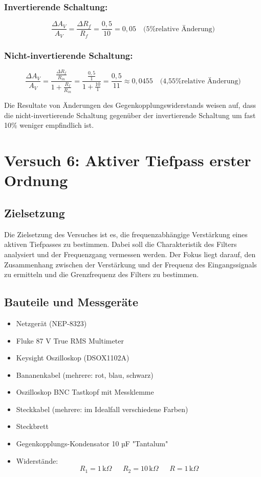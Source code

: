 \documentclass[a4paper,12pt]{article}
\begin{document}
\subsubsection*{Invertierende Schaltung:}
\[
\frac{\Delta A_V}{A_V} = \frac{\Delta R_f}{R_f} = \frac{0,5}{10} = 0,05 \quad \text{(5\% relative Änderung)}
\]

\subsubsection*{Nicht-invertierende Schaltung:}
\[
\frac{\Delta A_V}{A_V} = \frac{\frac{\Delta R_f}{R_{in}}}{1 + \frac{R_f}{R_{in}}} = \frac{\frac{0,5}{1}}{1 + \frac{10}{1}} = \frac{0,5}{11} \approx 0,0455 \quad \text{(4,55\% relative Änderung)}
\]

\noindent Die Resultate von Änderungen des Gegenkopplungswiderstands weisen auf, dass die nicht-invertierende Schaltung gegenüber der invertierende Schaltung um fast 10\% weniger empfindlich ist. 



\newpage
\section{Versuch 6: Aktiver Tiefpass erster Ordnung}
\subsection{Zielsetzung}

Die Zielsetzung des Versuches ist es, die frequenzabhängige Verstärkung eines aktiven Tiefpasses zu bestimmen. Dabei soll die Charakteristik des Filters analysiert und der Frequenzgang vermessen werden. Der Fokus liegt darauf, den Zusammenhang zwischen der Verstärkung und der Frequenz des Eingangssignals zu ermitteln und die Grenzfrequenz des Filters zu bestimmen.
\subsection{Bauteile und Messgeräte}
\begin{itemize}

\item Netzgerät (NEP-8323)
\item Fluke 87 V True RMS Multimeter
\item Keysight Oszilloskop (DSOX1102A)
\item Bananenkabel (mehrere: rot, blau, schwarz)
\item Oszilloskop BNC Tastkopf mit Messklemme
\item Steckkabel (mehrere: im Idealfall verschiedene Farben)
\item Steckbrett
\item Gegenkopplungs-Kondensator 10 µF "Tantalum"
\item Widerstände:
\[
 R_{1} = 1 \, \text{k}\Omega~~~~~~~R_{2} = 10 \, \text{k}\Omega~~~~~~~R = 1 \, \text{k}\Omega
\]
\end{itemize}
\end{document}
